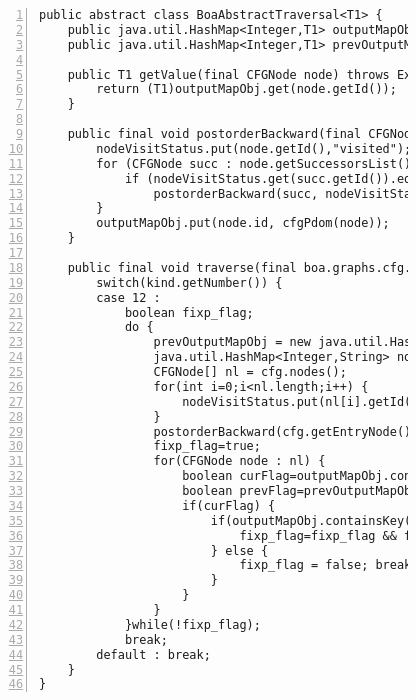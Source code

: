 \begin{figure}[ht!]
\begin{lstlisting}[numbers=left, tabsize=4, escapechar=@, caption={Implementation code of traversal with fixpoint.},label={lst:cfgPdom-impNodeids}] 
public abstract class BoaAbstractTraversal<T1> {
	public java.util.HashMap<Integer,T1> outputMapObj;
	public java.util.HashMap<Integer,T1> prevOutputMapObj;
	
	public T1 getValue(final CFGNode node) throws Exception {
		return (T1)outputMapObj.get(node.getId());
	}
	
	public final void postorderBackward(final CFGNode node, java.util.HashMap<Integer,String> nodeVisitStatus) throws Exception {
		nodeVisitStatus.put(node.getId(),"visited");
		for (CFGNode succ : node.getSuccessorsList()) {
			if (nodeVisitStatus.get(succ.getId()).equals("unvisited"))
				postorderBackward(succ, nodeVisitStatus);
		}
		outputMapObj.put(node.id, cfgPdom(node));
	}
	
	public final void traverse(final boa.graphs.cfg.CFG cfg, final Traversal.TraversalDirection direction, final Traversal.TraversalKind kind, final BoaAbstractFixP fixp) {
		switch(kind.getNumber()) {
		case 12 :
			boolean fixp_flag;
			do {
				prevOutputMapObj = new java.util.HashMap<Integer,T1>(outputMapObj);
				java.util.HashMap<Integer,String> nodeVisitStatus=new java.util.HashMap<Integer,String>();
				CFGNode[] nl = cfg.nodes();
				for(int i=0;i<nl.length;i++) {
					nodeVisitStatus.put(nl[i].getId(),"unvisited");
				}
				postorderBackward(cfg.getEntryNode(), nodeVisitStatus);						
				fixp_flag=true;
				for(CFGNode node : nl) {
					boolean curFlag=outputMapObj.containsKey(node.getId());
					boolean prevFlag=prevOutputMapObj.containsKey(node.getId());
					if(curFlag) {
						if(outputMapObj.containsKey(node.getId()) && prevOutputMapObj.containsKey(node.getId())) { 
							fixp_flag=fixp_flag && fixp.invoke((T1)outputMapObj.get(node.getId()),(T1)prevOutputMapObj.get(node.getId()));
						} else {
							fixp_flag = false; break;
						}
					}
				}
			}while(!fixp_flag);
			break;
		default : break;
	}
}
\end{lstlisting}
\end{figure}


